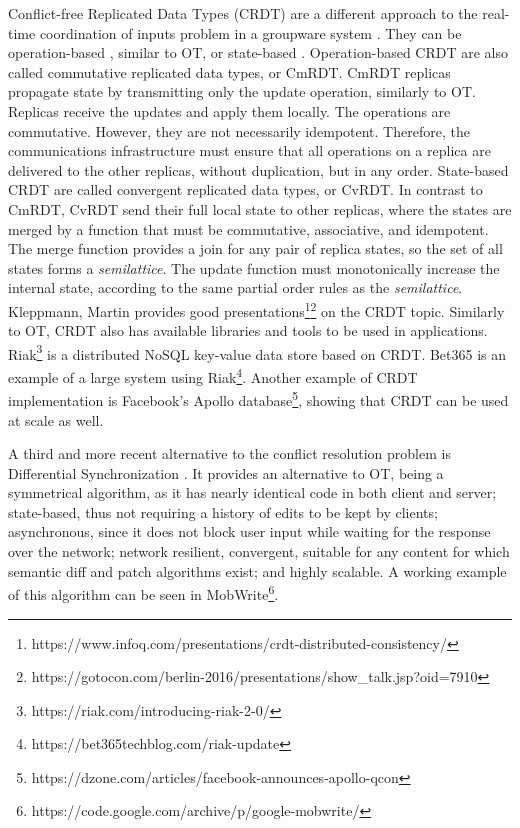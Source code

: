 Conflict-free Replicated Data Types (CRDT) are a different approach to the real-time coordination of inputs problem in a groupware system \cite{Shapiro2011}. They can be operation-based \cite{Letia2010} \cite{Baquero2014}, similar to OT, or state-based \cite{Baquero1999} \cite{Almeida2014}. Operation-based CRDT are also called commutative replicated data types, or CmRDT. CmRDT replicas propagate state by transmitting only the update operation, similarly to OT. Replicas receive the updates and apply them locally. The operations are commutative. However, they are not necessarily idempotent. Therefore, the communications infrastructure must ensure that all operations on a replica are delivered to the other replicas, without duplication, but in any order. State-based CRDT are called convergent replicated data types, or CvRDT. In contrast to CmRDT, CvRDT send their full local state to other replicas, where the states are merged by a function that must be commutative, associative, and idempotent. The merge function provides a join for any pair of replica states, so the set of all states forms a \textit{semilattice}. The update function must monotonically increase the internal state, according to the same partial order rules as the \textit{semilattice}. Kleppmann, Martin provides good presentations\footnote{https://www.infoq.com/presentations/crdt-distributed-consistency/}\footnote{https://gotocon.com/berlin-2016/presentations/show\_talk.jsp?oid=7910} on the CRDT topic. Similarly to OT, CRDT also has available libraries and tools to be used in applications. Riak\footnote{https://riak.com/introducing-riak-2-0/} is a distributed NoSQL key-value data store based on CRDT. Bet365 is an example of a large system using Riak\footnote{https://bet365techblog.com/riak-update}. Another example of CRDT implementation is Facebook's Apollo database\footnote{https://dzone.com/articles/facebook-announces-apollo-qcon}, showing that CRDT can be used at scale as well.

A third and more recent alternative to the conflict resolution problem is Differential Synchronization \cite{Fraser2009} \cite{Fraser-diff-sync-web}. It provides an alternative to OT, being a symmetrical algorithm, as it has nearly identical code in both client and server; state-based, thus not requiring a history of edits to be kept by clients; asynchronous, since it does not block user input while waiting for the response over the network; network resilient, convergent, suitable for any content for which semantic diff and patch algorithms exist; and highly scalable. A working example of this algorithm can be seen in MobWrite\footnote{https://code.google.com/archive/p/google-mobwrite/}.

